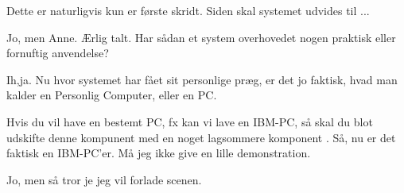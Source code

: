 \documentclass[a4paper,11pt]{article}
\begin{document}
\begin{sketch}
 Dette er naturligvis kun er første skridt. Siden  skal
systemet udvides til ...

 Jo, men Anne. Ærlig talt. Har sådan et system overhovedet nogen
praktisk eller fornuftig anvendelse?

 Ih,ja. Nu hvor systemet har fået sit personlige præg, er det jo
faktisk, hvad man kalder en Personlig Computer, eller en PC.

Hvis du vil have en bestemt PC, fx kan vi lave en IBM-PC, så skal du blot
udskifte denne kompunent  med en noget lagsommere komponent
. Så, nu er det faktisk en IBM-PC'er. Må
jeg ikke give en lille demonstration.

 Jo, men så tror je jeg vil forlade scenen. 

\end{sketch}
\end{document}
